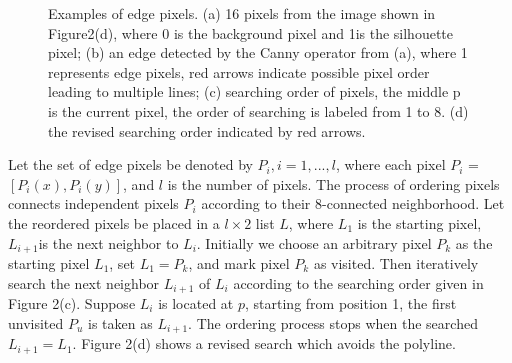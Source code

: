 \begin{figure}[htbp]
\centering
{}
\caption{Examples of edge pixels. (a) 16 pixels from the image shown in Figure2(d), where 0 is the background pixel and 1is the silhouette pixel; (b) an edge detected by the Canny operator from (a), where 1 represents edge pixels, red arrows indicate possible pixel order leading to multiple lines; (c) searching order of pixels, the middle p is the current pixel, the order of searching is labeled from 1 to 8. (d)  the revised searching order indicated by red arrows.}
\label {fig:Figure2}
\end{figure}

Let the set of edge pixels be denoted by ${P_i}, i=1,...,l$, where each pixel $P_i$ = $[P_i (x),P_i (y)]$, and $l$ is the number of pixels. The process of ordering pixels connects independent pixels ${P_i}$ according to their 8-connected neighborhood. Let the reordered pixels be placed in a $l\times2$ list $L$, where $L_1$ is the starting pixel, $L_{i+1} $is the next neighbor to $L_i$. Initially we choose an arbitrary pixel $P_k$ as the starting pixel $L_1$, set  $L_1= P_k$, and mark pixel $P_k$ as visited. Then iteratively search the next neighbor $L_{i+1}$ of $L_i$ according to the searching order given in Figure 2(c). Suppose $L_i$ is located at $p$, starting from position 1, the first unvisited $P_u$ is taken as $L_{i+1}$. The ordering process stops when the searched $L_{i+1}=L_1$. Figure 2(d) shows a revised search which avoids the polyline.
\fi


